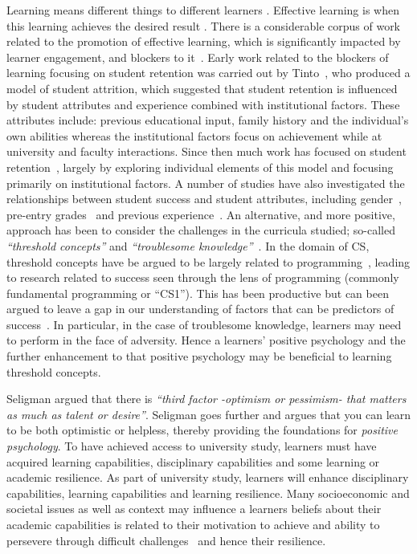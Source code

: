 \documentclass[sigconf]{acmart}
\begin{document}
Learning means different things to different learners \cite{saljo1979learning, Ramsden1992}. Effective learning is when this learning achieves the desired result \cite{kolb2014}. There is a considerable corpus of work related to the promotion of effective learning, which is significantly impacted by learner engagement, and blockers to it~\cite{kolb2014, Ramsden1992}. Early work related to the blockers of learning focusing on student retention was carried out by Tinto~\cite{Tinto1975}, who produced a model of student attrition, which suggested that student retention is influenced by student attributes and experience combined with institutional factors. These attributes include: previous educational input, family history and the individual's own abilities whereas the institutional factors focus on achievement while at university and faculty interactions. Since then much work has focused on student retention~\cite{Barbera2017,Chen2012}, largely by exploring individual elements of this model and focusing primarily on institutional factors. A number of studies have also investigated the relationships between student success and student attributes, including gender~\cite{Lishinski:2016:LPG:2960310.2960329}, pre-entry grades~\cite{Peterson1979} and previous experience~\cite{Ramalingam:2004:SMM:1026487.1008042}. An alternative, and more positive, approach has been to consider the challenges in the curricula studied; so-called {\em``threshold concepts''} and {\em``troublesome knowledge''}~\cite{Land2012}. In the domain of CS, threshold concepts have be argued to be largely related to programming~\cite{Sanders:2016:TCC:2999541.2999546}, leading to research related to success seen through the lens of programming (commonly fundamental programming or ``CS1''). This has been productive but can been argued to leave a gap in our understanding of factors that can be predictors of success~\cite{Liao:2019:RML:3308443.3277569,Castro-Wunsch:2017:ENN:3017680.3017792,Quille:2018:PPS:3197091.3197101}. In particular, in the case of troublesome knowledge, learners may need to perform in the face of adversity. Hence a learners' positive psychology and the further enhancement to that positive psychology may be beneficial to learning threshold concepts.

Seligman argued that there is {\em``third factor -optimism or pessimism- that matters as much as talent or desire''}\cite[p.~13]{Seligman90}. Seligman goes further and argues that you can learn to be both optimistic or helpless, thereby providing the foundations for {\em positive psychology}. To have achieved access to university study, learners must have acquired learning capabilities, disciplinary capabilities and some learning or academic resilience. As part of university study, learners will enhance disciplinary capabilities, learning capabilities and learning resilience.  Many socioeconomic and societal issues as well as context may influence a learners beliefs about their academic capabilities is related to their motivation to achieve and ability to persevere through difficult challenges~\cite{ZIMMERMAN200082,Bandura1977} and hence their resilience. 
 
\end{document}
